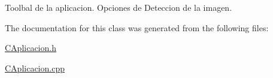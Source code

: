 Toolbal de la aplicacion. Opciones de Deteccion de la imagen. 



The documentation for this class was generated from the following files\+:\begin{DoxyCompactItemize}
\item 
\hyperlink{CAplicacion_8h}{C\+Aplicacion.\+h}\item 
\hyperlink{CAplicacion_8cpp}{C\+Aplicacion.\+cpp}\end{DoxyCompactItemize}
